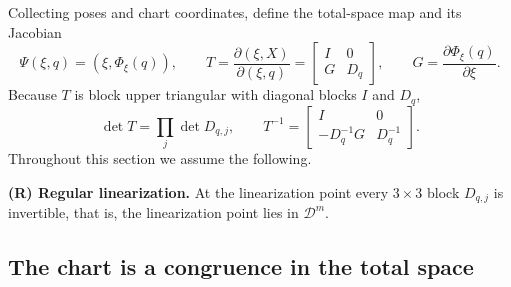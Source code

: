 \documentclass[11pt,a4paper]{article}
\theoremstyle{definition}
\theoremstyle{remark}
\begin{document}
Collecting poses and chart coordinates, define the total-space map and its Jacobian
\begin{equation}
\Psi(\xi,q)=(\xi,\Phi_\xi(q)),
\qquad
T=\frac{\partial(\xi,X)}{\partial(\xi,q)}
=\begin{bmatrix}I&0\\G&D_q\end{bmatrix},
\qquad
G=\frac{\partial\Phi_\xi(q)}{\partial\xi}.
\label{eq:T}
\end{equation}
Because $T$ is block upper triangular with diagonal blocks $I$ and $D_q$,
\begin{equation}
\det T=\prod_{j}\det D_{q,j},
\qquad
T^{-1}=\begin{bmatrix}I&0\\-D_q^{-1}G&D_q^{-1}\end{bmatrix}.
\label{eq:T-inverse}
\end{equation}
Throughout this section we assume the following.

\smallskip
\noindent\textbf{(R) Regular linearization.} At the linearization point every $3\times3$ block $D_{q,j}$ is invertible, that is, the linearization point lies in $\mathcal D^{m}$.

\subsection{The chart is a congruence in the total space}
\label{sec:congruence}
\end{document}
